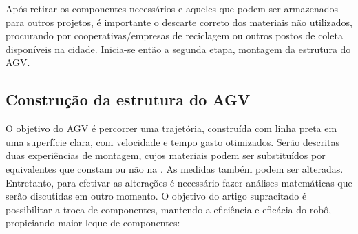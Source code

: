 \documentclass{textolivre-html}
\begin{document}


Após retirar os componentes necessários e aqueles que podem ser armazenados
para outros projetos, é importante o descarte correto dos materiais não
utilizados, procurando por cooperativas/empresas de reciclagem ou outros postos
de coleta disponíveis na cidade. Inicia-se então a segunda etapa, montagem da
estrutura do AGV.

\subsection{Construção da estrutura do AGV}\label{sec-constr-estr}
O objetivo do AGV é percorrer uma trajetória, construída com linha preta em uma
superfície clara, com velocidade e tempo gasto otimizados. Serão descritas duas
experiências de montagem, cujos materiais podem ser substituídos por
equivalentes que constam ou não na . As medidas também podem ser
alteradas. Entretanto, para efetivar as alterações é necessário fazer análises
matemáticas que serão discutidas em outro momento. O objetivo do artigo
supracitado é possibilitar a troca de componentes, mantendo a eficiência e
eficácia do robô, propiciando maior leque de componentes:
\end{document}
